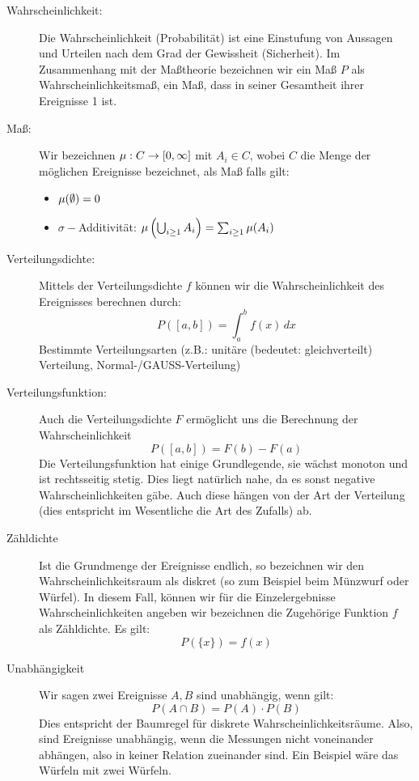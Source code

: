 \begin{description}
\item[Wahrscheinlichkeit:] Die Wahrscheinlichkeit (Probabilität) ist eine Einstufung von Aussagen und Urteilen nach dem Grad der Gewissheit (Sicherheit). Im Zusammenhang mit der Maßtheorie bezeichnen wir ein Maß $ P $ als Wahrscheinlichkeitsmaß, ein Maß, dass in seiner Gesamtheit ihrer Ereignisse 1 ist.
\item[Maß:] Wir bezeichnen $ \mu: C \to [0, \infty] $ mit $ A_i \in C $, wobei $ C $ die Menge der möglichen Ereignisse bezeichnet, als Maß falls gilt:
\begin{itemize}
\item $ \mu(\emptyset)=0 $
\item  $ \sigma- $Additivität: $ \mu\left ( \bigcup_{i\ge 1} A_i \right )= \sum_{i\ge 1} \mu(A_i) $
\end{itemize}
\item[Verteilungsdichte:] Mittels der Verteilungsdichte $ f $ können wir die Wahrscheinlichkeit des Ereignisses berechnen durch:
\[
P([a,b])=\int_a^b f(x) \, dx
\]
Bestimmte Verteilungsarten (z.B.: unitäre (bedeutet: gleichverteilt) Verteilung, Normal-/GAUSS-Verteilung)
\item[Verteilungsfunktion:] Auch die Verteilungsdichte $ F $ ermöglicht uns die Berechnung der Wahrscheinlichkeit
\[
P([a,b])=F(b)-F(a)
\]
Die Verteilungsfunktion hat einige Grundlegende,  sie wächst monoton und ist rechtsseitig stetig. Dies liegt natürlich nahe, da es sonst negative Wahrscheinlichkeiten gäbe. Auch diese hängen von der Art der Verteilung (dies entspricht im Wesentliche die Art des Zufalls) ab.
\item[Zähldichte] Ist die Grundmenge der Ereignisse endlich, so bezeichnen wir den Wahrscheinlichkeitsraum als diskret (so zum Beispiel beim Münzwurf oder Würfel). In diesem Fall,  können wir für die Einzelergebnisse Wahrscheinlichkeiten angeben wir bezeichnen die Zugehörige Funktion $ f $ als Zähldichte. Es gilt:
\[
P(\{x\})=f(x)
\]
\item[Unabhängigkeit] Wir sagen zwei Ereignisse $ A, B $ sind unabhängig, wenn gilt:
\[
P(A\cap B)=P(A)\cdot P(B)
\]
Dies entspricht der Baumregel für diskrete Wahrscheinlichkeitsräume.  Also, sind Ereignisse unabhängig, wenn die Messungen nicht voneinander abhängen, also in keiner Relation zueinander sind. Ein Beispiel wäre das Würfeln mit zwei Würfeln. 
\end{description}

